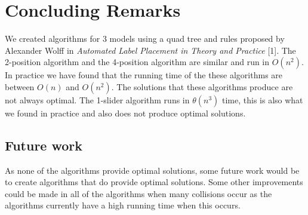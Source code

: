 \documentclass[crop=false,a4paper,oneside,11pt]{standalone}
\begin{document}
\section{Concluding Remarks}
We created algorithms for 3 models using a quad tree and rules proposed by Alexander Wolff in \emph{Automated Label Placement in Theory and Practice} [1]. The 2-position algorithm and the 4-position algorithm are similar and run in $O(n^2)$. In practice we have found that the running time of the these algorithms are between $O(n)$ and $O(n^2)$. The solutions that these algorithms produce are not always optimal. The 1-slider algorithm runs in $\theta(n^3)$ time, this is also what we found in practice and also does not produce optimal solutions. 

\subsection{Future work}
As none of the algorithms provide optimal solutions, some future work would be to create algorithms that do provide optimal solutions. Some other improvements could be made in all of the algorithms when many collisions occur as the algorithms currently have a high running time when this occurs.
\end{document}

